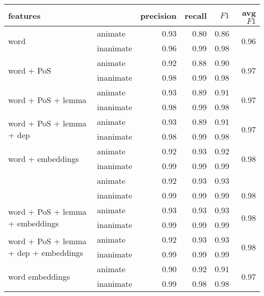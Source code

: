 \documentclass[a4paper,UKenglish]{oasics}
\begin{document}
\begin{table}
\centering
\begin{tabular}{llrrrr}
\toprule
features                                                 &           & precision & recall & $F1$ & avg $F1$              \\ \midrule
\multirow{2}{*}{word}                                    & animate   & 0.93      & 0.80   & 0.86 & \multirow{2}{*}{0.96} \\
                                                         & inanimate & 0.96      & 0.99   & 0.98 &                       \\
\multirow{2}{*}{word + PoS}                              & animate   & 0.92      & 0.88   & 0.90 & \multirow{2}{*}{0.97} \\
                                                         & inanimate & 0.98      & 0.99   & 0.98 &                       \\
\multirow{2}{*}{word + PoS + lemma}                      & animate   & 0.93      & 0.89   & 0.91 & \multirow{2}{*}{0.97} \\
                                                         & inanimate & 0.98      & 0.99   & 0.98 &                       \\
\multirow{2}{*}{word + PoS + lemma + dep}                & animate   & 0.93      & 0.89   & 0.91 & \multirow{2}{*}{0.97} \\
                                                         & inanimate & 0.98      & 0.99   & 0.98 &                       \\
\multirow{2}{*}{word + embeddings}                       & animate   & 0.92      & 0.93   & 0.92 & \multirow{2}{*}{0.98} \\
                                                         & inanimate & 0.99      & 0.99   & 0.99 &                       \\
\rowcolor{Gray}                                          & animate   & 0.92      & 0.93   & 0.93 &                       \\
\rowcolor{Gray}\multirow{-2}{*}{word + PoS + embeddings} & inanimate & 0.99      & 0.99   & 0.99 & \multirow{-2}{*}{0.98}\\
\multirow{2}{*}{word + PoS + lemma + embeddings}         & animate   & 0.93      & 0.93   & 0.93 & \multirow{2}{*}{0.98} \\
                                                         & inanimate & 0.99      & 0.99   & 0.99 &                       \\
\multirow{2}{*}{word + PoS + lemma + dep + embeddings}   & animate   & 0.92      & 0.93   & 0.93 & \multirow{2}{*}{0.98} \\
                                                         & inanimate & 0.99      & 0.99   & 0.99 &                       \\
\multirow{2}{*}{word embeddings}                         & animate   & 0.90      & 0.92   & 0.91 & \multirow{2}{*}{0.97} \\
                                                         & inanimate & 0.99      & 0.98   & 0.98 &                       \\


\end{tabular}
\end{table}
\end{document}
